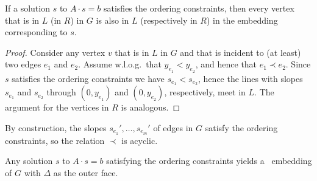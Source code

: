 \begin{obs}
If a solution $s$ to $A\cdot s=b$ satisfies the ordering constraints, then every vertex that is in $L$ (in $R$) in $G$ is also in $L$ (respectively in $R$) in the embedding corresponding to $s$. 
\end{obs}

\begin{proof}	  
Consider any vertex $v$ that is in $L$ in $G$ and that is incident to (at least) two edges $e_1$ and $e_2$. Assume w.l.o.g.\ that $y_{e_1} < y_{e_2}$, and hence that $e_1 \prec e_2$. Since $s$ satisfies the ordering constraints we have $s_{e_1} < s_{e_2}$, hence the lines with slopes $s_{e_1}$ and $s_{e_2}$ through $(0,y_{e_1})$ and $(0,y_{e_2})$, respectively, meet in $L$. The argument for the vertices in $R$ is analogous. 
\end{proof}	  

By construction, the slopes $s_{e_1}',\ldots,s_{e_m}'$ of edges
in $G$ satisfy the ordering constraints, so the relation $\prec$ is acyclic.

\begin{lem}
	Any solution $s$ to $A\cdot s=b$ satisfying
	the ordering constraints %
	yields a
	\Fary\ embedding of $G$ with $\Delta$ as the outer face.
\end{lem}

